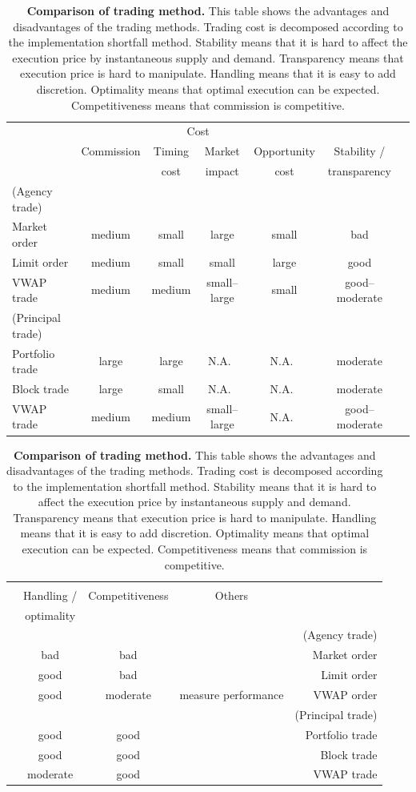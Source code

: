 \begin{table}[htbp]
\begin{flushleft}
\begin{tabular}{|l||c|c|c|c|c|l} \hline
 & \multicolumn{4}{c|}{Cost} & & \quad \\ \cline{2-5}
 & Commission & Timing  & Market & Opportunity & Stability / & \quad \\
 & & cost & impact & cost & transparency & \\ \hline
 (Agency trade) & & & & & & \\
 Market order & medium & small & large & small & bad & \\
 Limit order & medium & small & small & large & good & \\
 VWAP trade & medium & medium & small--large & small & good--moderate & \\ \hline
 (Principal trade) & & & & & & \\
 Portfolio trade & large & large & N.A.\ & N.A.\ & moderate & \\
 Block trade & large & small & N.A.\ & N.A.\ & moderate & \\
 VWAP trade & medium & medium & small--large & N.A.\ & good--moderate & \\ \hline
\end{tabular}
\end{flushleft}

\begin{flushright}
\begin{tabular}{l|c|c|c||r|} \hline
 \quad & & & & \\
 & Handling / & Competitiveness & Others & \\
 & optimality & & & \\ \hline
 & & & & (Agency trade) \\
 & bad & bad & & Market order \\
 & good & bad & & Limit order \\
 & good & moderate & measure performance & VWAP order \\ \hline
 & & & & (Principal trade) \\
 & good & good & & Portfolio trade \\
 & good & good & & Block trade \\
 & moderate & good & & VWAP trade \\ \hline
\end{tabular}
\end{flushright}
\caption[Comparison of trading method]{{\bf Comparison of trading method.}
 \quad This table shows the advantages and disadvantages of the trading methods.
 Trading cost is decomposed according to the implementation shortfall method.
 Stability means that it is hard to affect the execution price by instantaneous supply and demand.
 Transparency means that execution price is hard to manipulate.
 Handling means that it is easy to add discretion.
 Optimality means that optimal execution can be expected.
 Competitiveness means that commission is competitive.}
\label{table_i1}
\end{table}

